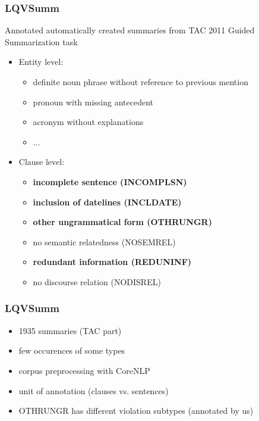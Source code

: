 \documentclass[table]{beamer}
\begin{document}
\begin{frame}
  \frametitle{LQVSumm \citep{friedrichlqvsumm}}
  Annotated automatically created summaries from TAC 2011 Guided Summarization task \citep{owczarzak2011overview}
\pause
  \begin{itemize}
    \item Entity level:
    \begin{itemize}
      \item definite noun phrase without reference to previous mention%
      \item pronoun with missing antecedent%
      \item acronym without explanations%
      \item ...
    \end{itemize}\pause
    \item Clause level:
    \begin{itemize}
      \item \textbf{incomplete sentence (INCOMPLSN)}
      \item \textbf{inclusion of datelines (INCLDATE)}
      \item \textbf{other ungrammatical form (OTHRUNGR)}
      \item no semantic relatedness (NOSEMREL)
      \item \textbf{redundant information (REDUNINF)}
      \item no discourse relation (NODISREL)
    \end{itemize}
  \end{itemize}
\end{frame}

\begin{frame}
  \frametitle{LQVSumm \citep{friedrichlqvsumm}}
  \begin{itemize}
    \item 1935 summaries (TAC part)
    \item few occurences of some types\pause
    \item corpus preprocessing with CoreNLP \citep{manning-EtAl:2014:P14-5}
    \item unit of annotation (clauses vs. sentences)\pause
    \item OTHRUNGR has different violation subtypes (annotated by us)
  \end{itemize}
\end{frame}
\end{document}
